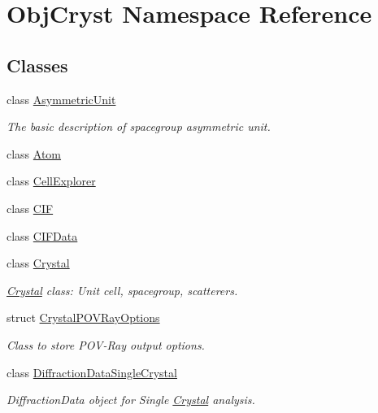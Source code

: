 \hypertarget{namespace_obj_cryst}{}\section{Obj\+Cryst Namespace Reference}
\label{namespace_obj_cryst}
\subsection*{Classes}
\begin{DoxyCompactItemize}
\item 
class \mbox{\hyperlink{class_obj_cryst_1_1_asymmetric_unit}{Asymmetric\+Unit}}
\begin{DoxyCompactList}\small\item\em The basic description of spacegroup asymmetric unit. \end{DoxyCompactList}\item 
class \mbox{\hyperlink{class_obj_cryst_1_1_atom}{Atom}}
\item 
class \mbox{\hyperlink{class_obj_cryst_1_1_cell_explorer}{Cell\+Explorer}}
\item 
class \mbox{\hyperlink{class_obj_cryst_1_1_c_i_f}{C\+IF}}
\item 
class \mbox{\hyperlink{class_obj_cryst_1_1_c_i_f_data}{C\+I\+F\+Data}}
\item 
class \mbox{\hyperlink{class_obj_cryst_1_1_crystal}{Crystal}}
\begin{DoxyCompactList}\small\item\em \mbox{\hyperlink{class_obj_cryst_1_1_crystal}{Crystal}} class\+: Unit cell, spacegroup, scatterers. \end{DoxyCompactList}\item 
struct \mbox{\hyperlink{struct_obj_cryst_1_1_crystal_p_o_v_ray_options}{Crystal\+P\+O\+V\+Ray\+Options}}
\begin{DoxyCompactList}\small\item\em Class to store P\+O\+V-\/\+Ray output options. \end{DoxyCompactList}\item 
class \mbox{\hyperlink{class_obj_cryst_1_1_diffraction_data_single_crystal}{Diffraction\+Data\+Single\+Crystal}}
\begin{DoxyCompactList}\small\item\em Diffraction\+Data object for Single \mbox{\hyperlink{class_obj_cryst_1_1_crystal}{Crystal}} analysis. \end{DoxyCompactList}\item 

\end{DoxyCompactItemize}

